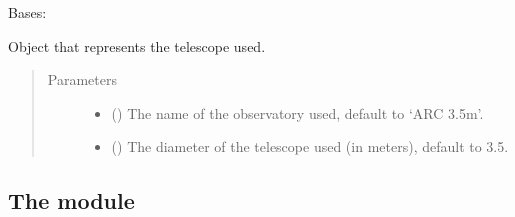 \documentclass[letterpaper,10pt,english]{sphinxmanual}
\begin{document}
\begin{fulllineitems}
\label{\detokenize{modules:arc.Telescope}}
Bases: 

Object that represents the telescope used.
\begin{quote}\begin{description}
\item[{Parameters}] \leavevmode\begin{itemize}
\item {} 
 (\sphinxstyleliteralemphasis{\sphinxupquote{,}}) \textendash{} The name of the observatory used, default to ‘ARC 3.5m’.

\item {} 
 (\sphinxstyleliteralemphasis{\sphinxupquote{, }}) \textendash{} The diameter of the telescope used (in meters), default to 3.5.

\end{itemize}

\end{description}\end{quote}

\end{fulllineitems}



\subsection{The  module}
\label{\detokenize{modules:the-signal-to-noise-module}}

\subsubsection{}
\label{\detokenize{modules:sky}}
\end{document}
